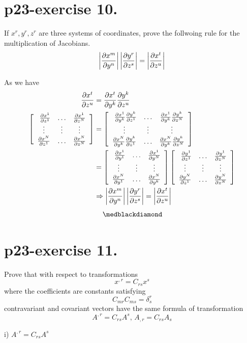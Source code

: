 \section{p23-exercise 10.}
\begin{tcolorbox}
If $x^r, y^r, z^r$ are three systems of coordinates, prove the follwoing rule for the multiplication of Jacobians.
$$\left|\pdv{x^m}{y^n}\right|\left|\pdv{y^r}{z^s}\right| = \left|\pdv{x^t}{z^u}\right|$$
\end{tcolorbox}
 As we have  
\begin{align}
\pdv{x^t}{z^u} &=\pdv{x^t}{y^k} \pdv{y^k}{z^u}\\
 \left[ { \begin{array}{ccc}
   \ \pdv{x^1}{z^1} & \dots & \pdv{x^1}{z^N}\\
   \vdots & \vdots & \vdots\\
    \pdv{x^N}{z^1} & \dots & \pdv{x^N}{z^N}\\
  \end{array}} \right] &= \left[ { \begin{array}{ccc}
   \ \pdv{x^1}{y^k}\pdv{y^k}{z^1} & \dots & \pdv{x^1}{y^k}\pdv{y^k}{z^N}\\
   \vdots & \vdots & \vdots\\
    \pdv{x^N}{y^k}\pdv{y^k}{z^1}& \dots & \pdv{x^N}{y^k}\pdv{y^k}{z^N}\\
  \end{array}} \right]\\
  &= \left[ { \begin{array}{ccc}
   \ \pdv{x^1}{y^1}& \dots & \pdv{x^1}{y^N}\\
   \vdots & \vdots & \vdots\\
    \pdv{x^N}{y^1}& \dots & \pdv{x^N}{y^k}\\
  \end{array}} \right]\left[ { \begin{array}{ccc}
   \ \pdv{y^1}{z^1} & \dots & \pdv{y^1}{z^N}\\
   \vdots & \vdots & \vdots\\
    \pdv{y^N}{z^1}& \dots & \pdv{y^N}{z^N}\\
  \end{array}} \right]\\
  \ & \Rightarrow \left|\pdv{x^m}{y^n}\right|\left|\pdv{y^r}{z^s}\right| = \left|\pdv{x^t}{z^u}\right|
  \end{align}
$$\medblackdiamond$$
\pagebreak[4]


\section{p23-exercise 11.}
\begin{tcolorbox}
Prove that with respect to transformations $$ x^{,r} = C_{rs}x^s$$ where the coefficients are constants satisfying $$C_{mr}C_{ms} = \delta^r_s$$ contravariant and covariant vectors have the same formula of transformation $$ A^{,r} = C_{rs}A^{s} \text{, } A_{,r} = C_{rs}A_{s} $$
\end{tcolorbox}
 i) $ A^{,r} = C_{rs}A^{s}$\\
 
